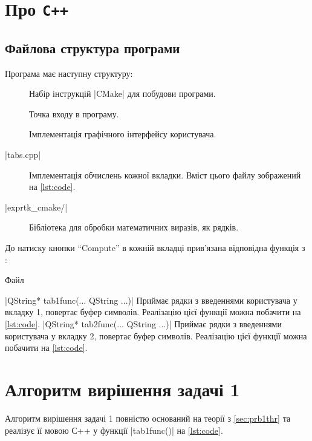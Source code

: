 \documentclass[../../../../document]{subfiles}
\begin{document}
	\section{Про \texttt{C++}}
	\subsection{Файлова структура програми}
	Програма має наступну структуру:
	\begin{description}
		\item[]
			Набір інструкцій \textinline|CMake| для побудови програми. 
		\item[]
			Точка входу в програму. 
		\item[]
			Імплементація графічного інтерфейсу користувача. 
		\item[\textinline|tabs.cpp|]
			Імплементація обчислень кожної вкладки. Вміст цього файлу зображений на \cref{lst:code}.
		\item[\textinline|exprtk_cmake/|] Бібліотека для обробки математичних виразів, як рядків.
	\end{description}
	До натиску кнопки \enquote{Compute} в кожній вкладці прив'язана відповідна функція з :
	\begin{longlisting}
		 \begin{Center}
		 \end{Center}
		 \caption{Файл }\label{lst:code}
	\end{longlisting}

	\begin{funcDescription}
		|QString* tab1func(... QString ...)|
			Приймає рядки з введеннями користувача у вкладку 1, повертає буфер символів. 
			Реалізацію цієї функції можна побачити на \cref{lst:code}.
		|QString* tab2func(... QString ...)|
			Приймає рядки з введеннями користувача у вкладку 2, повертає буфер символів.
			Реалізацію цієї функції можна побачити на \cref{lst:code}.
	\end{funcDescription}
	
	\section{Алгоритм вирішення задачі 1}
	Алгоритм вирішення задачі 1 повністю оснований на теорії з \cref{sec:prb1thr} та реалізує її мовою С++ у функції \cppinline|tab1func()| на \cref{lst:code}.
\end{document}
